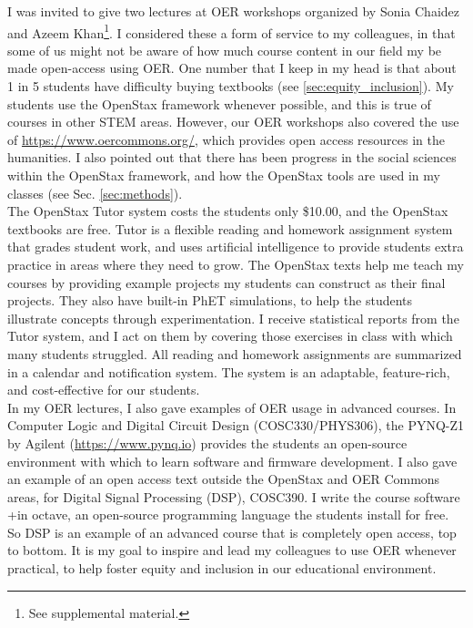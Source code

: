 \documentclass[../../../main.tex]{subfiles}
\begin{document}
\label{sec:oer_workshops}

I was invited to give two lectures at OER workshops organized by Sonia Chaidez and Azeem Khan\footnote{See supplemental material.}.  I considered these a form of service to my colleagues, in that some of us might not be aware of how much course content in our field my be made open-access using OER.  One number that I keep in my head is that about 1 in 5 students have difficulty buying textbooks (see \ref{sec:equity_inclusion}).  My students use the OpenStax framework whenever possible, and this is true of courses in other STEM areas.  However, our OER workshops also covered the use of \url{https://www.oercommons.org/}, which provides open access resources in the humanities.  I also pointed out that there has been progress in the social sciences within the OpenStax framework, and how the OpenStax tools are used in my classes (see Sec. \ref{sec:methods}).
\\
\vspace{0.25cm}
The OpenStax Tutor system costs the students only \$10.00, and the OpenStax textbooks are free.  Tutor is a flexible reading and homework assignment system that grades student work, and uses artificial intelligence to provide students extra practice in areas where they need to grow.  The OpenStax texts help me teach my courses by providing example projects my students can construct as their final projects.  They also have built-in PhET simulations, to help the students illustrate concepts through experimentation.  I receive statistical reports from the Tutor system, and I act on them by covering those exercises in class with which many students struggled.  All reading and homework assignments are summarized in a calendar and notification system.  The system is an adaptable, feature-rich, and cost-effective for our students.
\\
\vspace{0.25cm}
In my OER lectures, I also gave examples of OER usage in advanced courses.  In Computer Logic and Digital Circuit Design (COSC330/PHYS306), the PYNQ-Z1 by Agilent (\url{https://www.pynq.io}) provides the students an open-source environment with which to learn software and firmware development.  I also gave an example of an open access text outside the OpenStax and OER Commons areas, for Digital Signal Processing (DSP), COSC390.  I write the course software +in octave, an open-source programming language the students install for free.  So DSP is an example of an advanced course that is completely open access, top to bottom.  It is my goal to inspire and lead my colleagues to use OER whenever practical, to help foster equity and inclusion in our educational environment.
\end{document}
